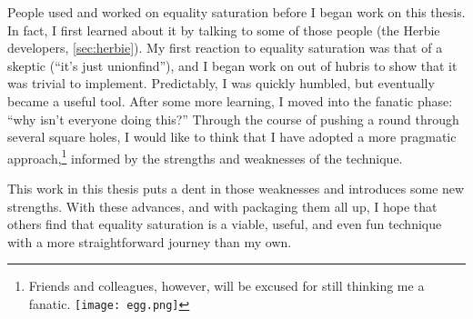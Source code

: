 People used and worked on equality saturation before
 I began work on this thesis.
In fact,
 I first learned about it by
 talking to some of those people (the Herbie developers, \autoref{sec:herbie}).
My first reaction
 to equality saturation was that of a skeptic (``it's just unionfind''),
 and I began
 work on \egg out of hubris to show that it was trivial to implement.
Predictably, I was quickly humbled,
 but eventually \egg became a useful tool.
After some more learning,
 I moved into the fanatic phase: ``why isn't everyone doing this?''
Through the course of pushing a round \egg through several square holes,
 I would like to think that I have adopted a more pragmatic approach,\footnote{
   Friends and colleagues, however, will be excused for still thinking
   me a fanatic. \texttt{[image: egg.png]}
}
 informed by the strengths and weaknesses of the technique.

This work in this thesis puts a dent in those weaknesses
 and introduces some new strengths.
With these advances,
 and with \egg packaging them all up,
 I hope that others find that equality saturation
 is a viable, useful, and even fun
 technique with a more straightforward journey than my own.

